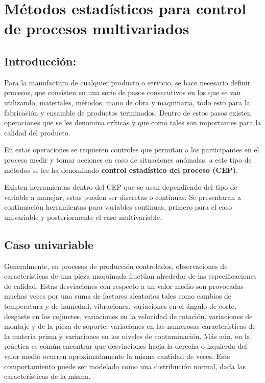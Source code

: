 \documentclass[spanish]{report}
\begin{document}
\chapter{Métodos estadísticos para control de procesos multivariados}


\section{Introducción:}

Para la manufactura de cualquier producto o servicio, se hace necesario
definir procesos, que consisten en una serie de pasos
consecutivos en los que se van utilizando, materiales, métodos,
mano de obra y maquinaria, todo esto para la fabricación y ensamble de productos
terminados. Dentro de estos pasos existen operaciones que se les denomina
críticas y que como tales son importantes para la calidad del producto.

En estas operaciones se requieren controles que permitan
a los participantes en el proceso medir y tomar acciones en caso de
situaciones anómalas, a este tipo de métodos se les ha denominado
\textbf{control estadístico del proceso (CEP)}.

Existen herramientas dentro del CEP que se usan dependiendo del tipo
de variable a manejar, estas pueden ser discretas o continuas. Se
presentaran a continuación herramientas para variables continuas,
primero para el caso univariable y posteriormente el caso multivariable.


\section{Caso univariable}

Generalmente, en procesos de producción controlados, observaciones
de características de una pieza maquinada fluctúan alrededor de las
especificaciones de calidad. Estas desviaciones con respecto a un
valor medio son provocadas muchas veces por una suma de factores aleatorios
tales como cambios de temperatura y de humedad, vibraciones, variaciones
en el ángulo de corte, desgaste en los cojinetes, variaciones en la
velocidad de rotación, variaciones de montaje y de la pieza de soporte,
variaciones en las numerosas características de la materia prima y
variaciones en los niveles de contaminación. Más aún, en la práctica
es común encontrar que desviaciones hacia la derecha o izquierda del
valor medio ocurren aproximadamente la misma cantidad de veces. Este
comportamiento puede ser modelado como una distribución normal, dada
las características de la misma.
\end{document}
